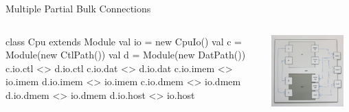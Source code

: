 \documentclass[xcolor=pdflatex,dvipsnames,table]{beamer}
\begin{document}
\begin{frame}[fragile]{Multiple Partial Bulk Connections}
\begin{columns}

\begin{scala}
class Cpu extends Module {
  val io = new CpuIo()
  val c  = Module(new CtlPath())
  val d  = Module(new DatPath())
  c.io.ctl  <> d.io.ctl
  c.io.dat  <> d.io.dat
  c.io.imem <> io.imem
  d.io.imem <> io.imem
  c.io.dmem <> io.dmem
  d.io.dmem <> io.dmem
  d.io.host <> io.host
}
\end{scala}


\begin{center}
\includegraphics[width=0.9\textwidth]{../tutorial/figs/cpu.png} 
\end{center}

\end{columns}
\end{frame}
\end{document}
